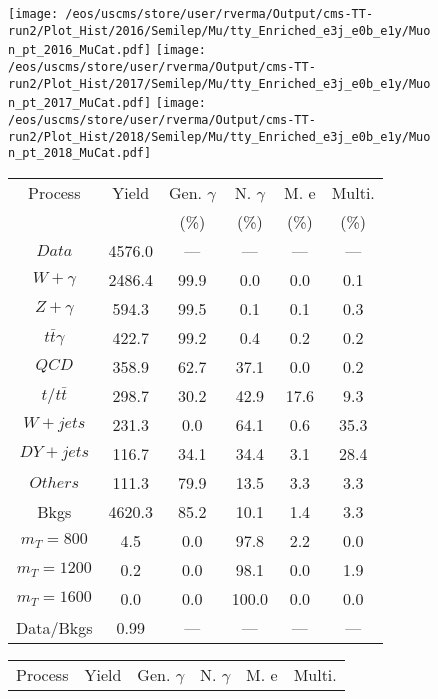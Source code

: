 \begin{figure}
\centering
\texttt{[image: /eos/uscms/store/user/rverma/Output/cms-TT-run2/Plot\_Hist/2016/Semilep/Mu/tty\_Enriched\_e3j\_e0b\_e1y/Muon\_pt\_2016\_MuCat.pdf]}
\texttt{[image: /eos/uscms/store/user/rverma/Output/cms-TT-run2/Plot\_Hist/2017/Semilep/Mu/tty\_Enriched\_e3j\_e0b\_e1y/Muon\_pt\_2017\_MuCat.pdf]}
\texttt{[image: /eos/uscms/store/user/rverma/Output/cms-TT-run2/Plot\_Hist/2018/Semilep/Mu/tty\_Enriched\_e3j\_e0b\_e1y/Muon\_pt\_2018\_MuCat.pdf]}
\begin{minipage}[c]{0.32\textwidth}
\centering
\tiny{
\begin{tabular}{cccccc}
\hline
Process & Yield & Gen. $\gamma$ & N. $\gamma$ & M. e & Multi. \\
 &  & (\%) & (\%) & (\%) & (\%)  \\
\hline
                                                                      $ Data $ &  4576.0 &  --- &  --- &  --- &  ---\\
$ W+\gamma $ &  2486.4 &  99.9 &  0.0 &  0.0 &  0.1\\
$ Z+\gamma $ &  594.3 &  99.5 &  0.1 &  0.1 &  0.3\\
$ t\bar{t}\gamma $ &  422.7 &  99.2 &  0.4 &  0.2 &  0.2\\
$ QCD $ &  358.9 &  62.7 &  37.1 &  0.0 &  0.2\\
$ t/t\bar{t} $ &  298.7 &  30.2 &  42.9 &  17.6 &  9.3\\
$ W+jets $ &  231.3 &  0.0 &  64.1 &  0.6 &  35.3\\
$ DY+jets $ &  116.7 &  34.1 &  34.4 &  3.1 &  28.4\\
$ Others $ &  111.3 &  79.9 &  13.5 &  3.3 &  3.3\\
Bkgs &  4620.3 &  85.2 &  10.1 &  1.4 &  3.3\\
$ m_{T} = 800 $ &  4.5 &  0.0 &  97.8 &  2.2 &  0.0\\
$ m_{T} = 1200 $ &  0.2 &  0.0 &  98.1 &  0.0 &  1.9\\
$ m_{T} = 1600 $ &  0.0 &  0.0 &  100.0 &  0.0 &  0.0\\
Data/Bkgs &  0.99 &  --- &  --- &  --- &  ---\\
\hline
\end{tabular}
}
\end{minipage}
\begin{minipage}[c]{0.32\textwidth}
\centering
\tiny{
\begin{tabular}{cccccc}
\hline
Process & Yield & Gen. $\gamma$ & N. $\gamma$ & M. e & Multi. \\

\end{tabular}}
\end{minipage}
\end{figure}

